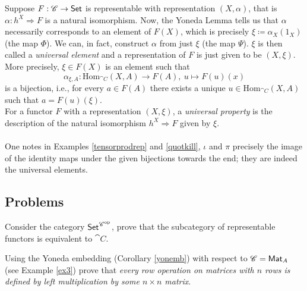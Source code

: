 \vspace*{0.1in}

\begin{discussion}\label{univel}
Suppose $F:\mathscr{C} \to \mathsf{Set}$ is representable with representation $(X,\alpha)$, that is $\alpha:h^X \Rightarrow F$ is a natural isomorphism. Now, the Yoneda Lemma tells us that $\alpha$ necessarily corresponds to an element of $F(X)$, which is precisely $\xi \coloneqq \alpha_X(1_X)$ (the map $\Phi$). We can, in fact, construct $\alpha$ from just $\xi$ (the map $\Psi$). $\xi$ is then called a \emph{universal element} and a representation of $F$ is just given to be $(X,\xi)$. More precisely, $\xi \in F(X)$ is an element such that
\[\alpha_{\xi,A}:\mathrm{Hom}_{\cat{C}}(X,A) \to F(A),\ u \mapsto F(u)(x)\]
is a bijection, i.e., for every $a \in F(A)$ there exists a unique $u \in \mathrm{Hom}_{\cat{C}}(X,A)$ such that $a = F(u)(\xi)$.
\\[0.5em]
For a functor $F$ with a representation $(X,\xi)$, a \emph{universal property} is the description of the natural isomorphism $h^X \Rightarrow F$ given by $\xi$.\\
\\
One notes in Examples \ref{tensorprodrep} and \ref{quotkill}, $\iota$ and $\pi$ precisely the image of the identity maps under the given bijections towards the end; they are indeed the universal elements.
\end{discussion}

\vspace*{0.2in}

\subsection{Problems}
\vspace{0.1in}

\begin{problem}\label{prob 5.1}
Consider the category $\mathsf{Set}^{\mathscr{C}^{\text{op}}}$, prove that the subcategory of representable functors is equivalent to $\cat{C}$.
\end{problem}

\vspace{0.1in}

\begin{problem}\label{prob 5.2}
Using the Yoneda embedding (Corollary \ref{yonemb}) with respect to $\mathscr{C} = \mathsf{Mat}_A$ (see Example \ref{ex3}) prove that \emph{every row operation on matrices with $n$ rows is defined by left multiplication by some $n \times n$ matrix}.
\end{problem}

